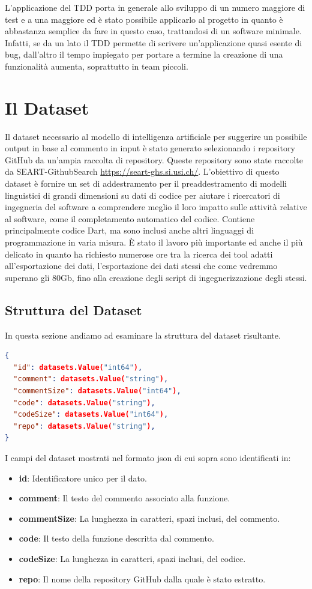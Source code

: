 L'applicazione del TDD porta in generale allo sviluppo di un numero maggiore di test e a una maggiore ed è stato possibile applicarlo al progetto in quanto è abbastanza semplice da fare in questo caso, trattandosi di un software minimale. Infatti, se da un lato il TDD permette di scrivere un'applicazione quasi esente di bug, dall'altro il tempo impiegato per portare a termine la creazione di una funzionalità aumenta, soprattutto in team piccoli.





\section{Il Dataset}
Il dataset necessario al modello di intelligenza artificiale per suggerire un possibile output in base al commento in input è stato generato selezionando i repository GitHub da un'ampia raccolta di repository. Queste repository sono state raccolte da SEART-GithubSearch \url{https://seart-ghs.si.usi.ch/}\cite{Dabic:msr2021data}. L'obiettivo di questo dataset è fornire un set di addestramento per il preaddestramento di modelli linguistici di grandi dimensioni su dati di codice per aiutare i ricercatori di ingegneria del software a comprendere meglio il loro impatto sulle attività relative al software, come il completamento automatico del codice. Contiene principalmente codice Dart, ma sono inclusi anche altri linguaggi di programmazione in varia misura.
È stato il lavoro più importante ed anche il più delicato in quanto ha richiesto numerose ore tra la ricerca dei tool adatti all'esportazione dei dati, l'esportazione dei dati stessi che come vedremmo superano gli 80Gb, fino alla creazione degli script di ingegnerizzazione degli stessi.
\subsection{Struttura del Dataset}
In questa sezione andiamo ad esaminare la struttura del dataset risultante.
\begin{lstlisting}[language=json,firstnumber=1]
{
  "id": datasets.Value("int64"),
  "comment": datasets.Value("string"),
  "commentSize": datasets.Value("int64"),
  "code": datasets.Value("string"),
  "codeSize": datasets.Value("int64"),
  "repo": datasets.Value("string"),
}
\end{lstlisting}
I campi del dataset mostrati nel formato json di cui sopra sono identificati in:
\begin{itemize}
    \item \textbf{id}: Identificatore unico per il dato.
    \item \textbf{comment}: Il testo del commento associato alla funzione.
    \item \textbf{commentSize}: La lunghezza in caratteri, spazi inclusi, del commento.
    \item \textbf{code}: Il testo della funzione descritta dal commento.
    \item \textbf{codeSize}: La lunghezza in caratteri, spazi inclusi, del codice.
    \item \textbf{repo}: Il nome della repository GitHub dalla quale è stato estratto.
\end{itemize}

